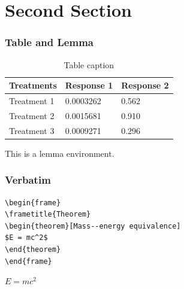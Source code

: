 \documentclass[compress]{beamer}
\numberwithin{figure}{section}
\numberwithin{table}{section}
\numberwithin{equation}{section}
\numberwithin{figure}{section}
\numberwithin{table}{section}
\numberwithin{equation}{section}
\begin{document}
\section{Second Section}

\begin{frame}
\frametitle{Table and Lemma}
\begin{table}
\caption{Table caption}
\begin{tabular}{l l l}
\toprule
Treatments & Response 1 & Response 2 \\
\midrule
Treatment 1 & 0.0003262 & 0.562 \\
Treatment 2 & 0.0015681 & 0.910 \\
Treatment 3 & 0.0009271 & 0.296 \\
\bottomrule
\end{tabular}
\end{table}

\begin{lemma}
This is a lemma environment.
\end{lemma}
\end{frame}




\begin{frame}[fragile] %
\frametitle{Verbatim}
\begin{example}
\begin{verbatim}
\begin{frame}
\frametitle{Theorem}
\begin{theorem}[Mass--energy equivalence]
$E = mc^2$
\end{theorem}
\end{frame}\end{verbatim}
\end{example}

\begin{theorem}
$E = mc^2$
\end{theorem}
\end{frame}

\end{document}
